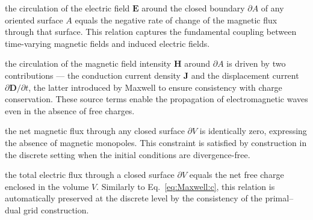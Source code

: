 \begin{mydescription}
\item[Faraday's law~\eqref{eq:Maxwell:a}:] the circulation of the electric
field $\mathbf{E}$ around the closed boundary $\partial A$ of any oriented surface $A$ equals the negative rate of change of the magnetic flux through that surface. This relation captures the fundamental coupling between time-varying magnetic fields and induced electric fields.

\item[Amp\`ere--Maxwell law~\eqref{eq:Maxwell:b}:] the circulation of the
magnetic field intensity $\mathbf{H}$ around $\partial A$ is driven by two contributions --- the conduction current density $\mathbf{J}$ and the displacement current $\partial \mathbf{D}/\partial t$, the latter introduced by Maxwell to ensure consistency with charge conservation. These source terms enable the propagation of electromagnetic waves even in the absence of free charges.

\item[Gauss's law for magnetic fields~\eqref{eq:Maxwell:c}:] the net magnetic
flux through any closed surface $\partial V$ is identically zero, expressing the absence of magnetic monopoles. This constraint is satisfied by construction in the discrete setting when the initial conditions are divergence-free.

\item[Gauss's law for electric fields~\eqref{eq:Maxwell:d}:] the total electric
flux through a closed surface $\partial V$ equals the net free charge enclosed in the volume $V$. Similarly to Eq.~\eqref{eq:Maxwell:c}, this relation is automatically preserved at the discrete level by the consistency of the primal--dual grid construction.
\end{mydescription}

